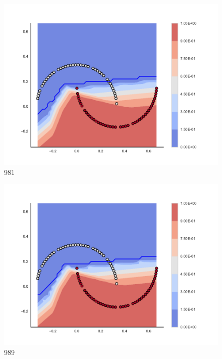\begin{subfigure}[b]{0.09\textwidth}
    \includegraphics[clip, trim=2.35cm 1.75cm 4.5cm 0cm,width=\textwidth]{img/convergence/981.pdf}
    \caption{981}
    \label{fig:convergence_981}
\end{subfigure}
%
\begin{subfigure}[b]{0.09\textwidth}
    \includegraphics[clip, trim=2.35cm 1.75cm 4.5cm 0cm,width=\textwidth]{img/convergence/989.pdf}
    \caption{989}
    \label{fig:convergence_989}
\end{subfigure}
%
